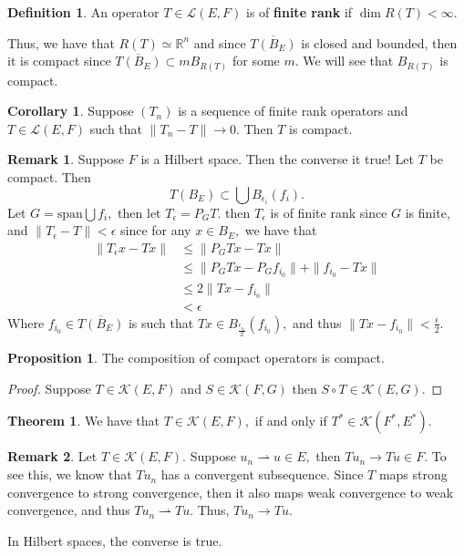 \documentclass[10pt, oneside]{article}
\newcommand{\bbR}{\mathbb{R}}
\theoremstyle{definition}
\newtheorem{thm}{Theorem}
\newtheorem{defn}{Definition}
\newtheorem{prop}{Proposition}
\newtheorem{rem}{Remark}
\newtheorem{cor}{Corollary}
\begin{document}
\begin{defn}
    An operator $T\in \mathcal{L}(E,F)$ is of \textbf{finite rank} if $\dim R(T) < \infty.$
\end{defn}
Thus, we have that $R(T)\simeq \bbR^n$ and since $\overline{T(B_E)}$ is closed and bounded, then  it is compact since $\overline{T(B_E)}\subset m B_{R(T)}$ for some $m.$ We will see that $B_{R(T)}$ is compact. 
\begin{cor}
    Suppose $(T_n)$ is a sequence of finite rank operators and $T\in \mathcal{L}(E,F)$ such that $\|T_n - T\| \to 0.$ Then $T$ is compact. 
\end{cor}
\begin{rem}
    Suppose $F$ is a Hilbert space. Then the converse it true! Let $T$ be compact. Then 
    \[T(B_E)\subset \bigcup B_{\epsilon_i}(f_i).\] Let $G = \text{span}\bigcup f_i,$ then let $T_\epsilon  = P_GT.$ then $T_\epsilon$ is of finite rank since $G$ is finite, and $\|T_\epsilon - T\|< \epsilon$ since for any $x\in B_E,$ we have that
    \begin{align*}
        \|T_\epsilon x - Tx\| &\leq \|P_G Tx - Tx\|\\
        &\leq \|P_GTx - P_Gf_{i_0}\| + \|f_{i_0} - Tx\|\\
        &\leq 2\|Tx - f_{i_0}\|\\
        &< \epsilon
    \end{align*}
    Where $f_{i_0} \in \overline{T(B_E)}$ is such that $Tx\in B_{\frac{\epsilon_{i_0}}{2}}(f_{i_0}),$ and thus $\|Tx - f_{i_0}\|< \frac{\epsilon}{2}.$
\end{rem}

\begin{prop}
    The composition of compact operators is compact.
\end{prop}
\begin{proof}
    Suppose $T \in \mathcal{K}(E,F)$ and $S\in \mathcal{K}(F,G)$ then $S\circ T \in \mathcal{K}(E, G).$ 
\end{proof}

\begin{thm}
    We have that $T \in \mathcal{K}(E,F),$ if and only if $T^* \in \mathcal{K}(F^*, E^*).$ 
\end{thm}
\begin{rem}
    Let $T \in \mathcal{K}(E,F).$ Suppose $u_n \rightharpoonup u \in E,$ then $Tu_n \to Tu \in F.$ To see this, we know that $Tu_n$ has a convergent subsequence. Since $T$ maps strong convergence to strong convergence, then it also maps weak convergence to weak convergence, and thus $Tu_n \rightharpoonup Tu.$ Thus, $Tu_n \to Tu.$ 
    
    In Hilbert spaces, the converse is true. 
\end{rem}
\end{document}
